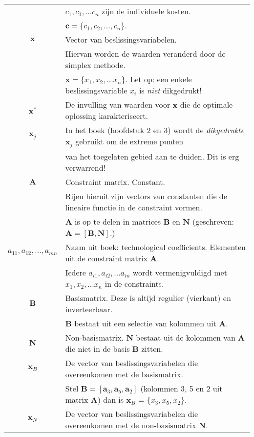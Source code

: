 \documentclass[10pt,a4paper]{article}
\begin{document}
\begin{tabular}{|c|l|}
 & $c_1, c_1, ... c_n$ zijn de individuele kosten. \\ & $\textbf{c} = \{c_1, c_2, ..., c_n\}$. \\ 
\hline 
$\textbf{x}$ & Vector van beslissingsvariabelen. \\ & Hiervan worden de waarden veranderd door de simplex methode. \\ & $\textbf{x} = \{x_1, x_2, ... x_n\}$. Let op: een enkele beslissingsvariable $x_i$ is \textit{niet} dikgedrukt! \\
\hline
$\textbf{x}^*$ & De invulling van waarden voor $\textbf{x}$ die de optimale oplossing karakteriseert. \\ %
\hline
$\textbf{x}_j$ & In het boek (hoofdstuk 2 en 3) wordt de \textit{dikgedrukte} $\textbf{x}_j$ gebruikt om de extreme punten \\ 
 & van het toegelaten gebied aan te duiden. Dit is erg verwarrend! \\
\hline
$\textbf{A}$ & Constraint matrix. Constant. \\ 
 & Rijen hieruit zijn vectors van constanten die de lineaire functie in de constraint vormen. \\
 & $\textbf{A}$ is op te delen in matrices $\textbf{B}$ en $\textbf{N}$ (geschreven: $\textbf{A} = [\textbf{B}, \textbf{N}]$.) \\ %
\hline
$a_{11}, a_{12}, ..., a_{mn}$ & Naam uit boek: technological coefficients. Elementen uit de constraint matrix $\textbf{A}$.\\
& Iedere $a_{i1}, a_{i2}, ... a_{in}$ wordt vermenigvuldigd met $x_1, x_2, ... x_n$ in de constraints. \\
\hline
$\textbf{B}$ & Basismatrix. Deze is altijd regulier (vierkant) en inverteerbaar. \\ %
& $\textbf{B}$ bestaat uit een selectie van kolommen uit $\textbf{A}$.  \\
\hline
$\textbf{N}$ & Non-basismatrix. $\textbf{N}$ bestaat uit de kolommen van $\textbf{A}$ die niet in de basis $\textbf{B}$ zitten. \\
\hline
$\textbf{x}_B$ & De vector van beslissingsvariabelen die overeenkomen met de basismatrix. \\
& Stel $\textbf{B} = [\textbf{a}_3, \textbf{a}_5, \textbf{a}_2]$ (kolommen 3, 5 en 2 uit matrix $\textbf{A}$) dan is $\textbf{x}_B$ = $\{x_3, x_5, x_2\}$. \\
\hline
$\textbf{x}_N$ & De vector van beslissingsvariabelen die overeenkomen met de non-basismatrix $\textbf{N}$. \\

\end{tabular}
\end{document}
